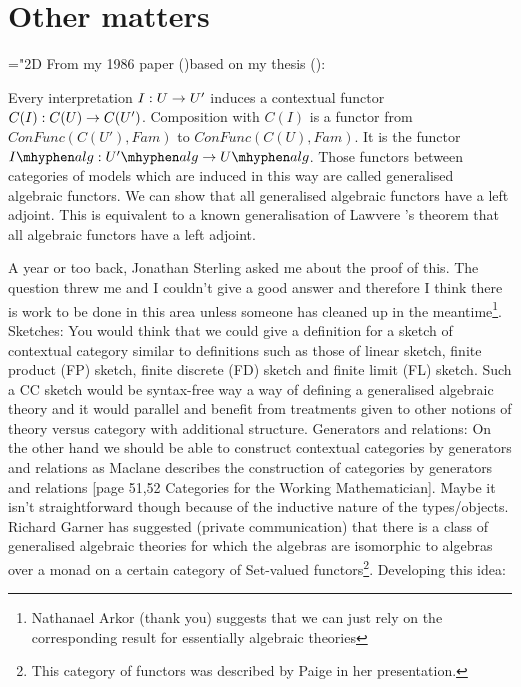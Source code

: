 \documentclass[10pt,a4paper]{article}
\theoremstyle{remark}
\begin{document}
\section{Other matters}
\mathchardef\mhyphen="2D %
\newcommand{\Ualg}{U \mhyphen alg}
\newcommand{\Upalg}{U' \mhyphen alg}
\newcommand{\Ialg}{I \mhyphen alg}
\note From my 1986 paper (\cite{Cartmell86})based on my thesis (\cite{Cartmell78}):
\begin{tightquote}
Every interpretation $I:U \rightarrow U'$ induces a contextual functor 
$C(I):C(U) \rightarrow C(U')$. Composition with $C(I)$ is a functor from 
$ConFunc(C(U'),Fam)$ to
$ConFunc(C(U),Fam)$. It is the functor $\Ialg:\Upalg \morph \Ualg$. Those functors
between categories of models which are induced in this way are called generalised
algebraic functors. We can show that all generalised algebraic functors have a left adjoint.
This is
equivalent to a known generalisation of Lawvere \cite{LawvereAlgebraicTheories}'s theorem that all algebraic
functors have a left adjoint. 
\end{tightquote}
A year or too back, Jonathan Sterling asked me about the proof of this. The question threw me and I couldn't give a good answer and therefore I think there is work to be done in this area unless someone has cleaned up in the meantime\footnote{Nathanael Arkor (thank you) suggests that we can just rely on the corresponding result for essentially algebraic theories}.
\note
Sketches: You would think that we could give a definition for a sketch of contextual category 
similar to  definitions such as those of linear sketch, finite product (FP) sketch, finite discrete (FD) sketch and finite limit (FL) sketch. Such a CC sketch would be syntax-free way a way of defining a generalised algebraic theory and it would parallel and benefit from treatments given to other notions of theory versus category with additional structure. 
\note
Generators and relations: On the other hand we should be able to construct contextual categories by generators and  
relations as Maclane describes the construction of categories by generators and relations
[page 51,52 Categories for the Working Mathematician]. Maybe it isn't  straightforward  though because of the inductive nature of the types/objects. 
\note Richard Garner has suggested (private communication) that there is a class of generalised algebraic theories for which the algebras are isomorphic to algebras  over a monad on a certain category of Set-valued functors\footnote{This category of functors was described by Paige in her presentation.}. Developing this idea: 
\end{document}
